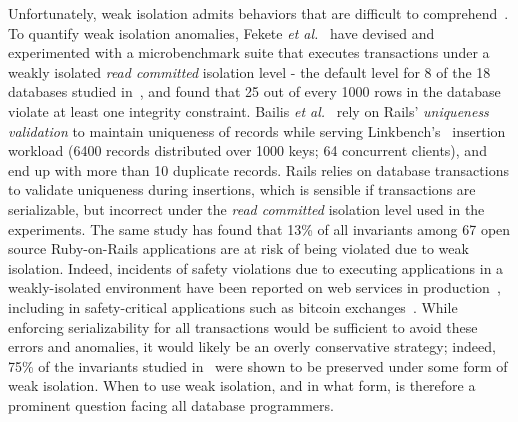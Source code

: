 Unfortunately, weak isolation admits behaviors that are difficult to
comprehend~\cite{berenson}. To quantify weak isolation anomalies,
Fekete \emph{et al.}~\cite{feketevldb09} have devised and experimented
with a microbenchmark suite that executes transactions under a weakly
isolated \emph{read committed} isolation level - the default level for
8 of the 18 databases studied in~\cite{bailishotos}, and found that 25
out of every 1000 rows in the database violate at least one integrity
constraint. Bailis \emph{et al.}~\cite{bailisferal} rely on Rails'
\emph{uniqueness validation} to maintain uniqueness of records while
serving Linkbench's~\cite{linkbench} insertion workload (6400 records
distributed over 1000 keys; 64 concurrent clients), and end up with
more than 10 duplicate records. Rails relies on database transactions
to validate uniqueness during insertions, which is sensible if
transactions are serializable, but incorrect under the \emph{read
  committed} isolation level used in the experiments. The same study
has found that 13\% of all invariants among 67 open source
Ruby-on-Rails applications are at risk of being violated due to weak
isolation. Indeed, incidents of safety violations due to executing
applications in a weakly-isolated environment have been reported on
web services in production~\cite{starbucksbug, scimedbug}, including
in safety-critical applications such as bitcoin
exchanges~\cite{poloniexbug, bitcoinbug}. While enforcing
serializability for all transactions would be sufficient to avoid
these errors and anomalies, it would likely be an overly conservative
strategy; indeed, 75\% of the invariants studied in~\cite{bailisferal}
were shown to be preserved under some form of weak isolation.  When to
use weak isolation, and in what form, is therefore a prominent
question facing all database programmers.

